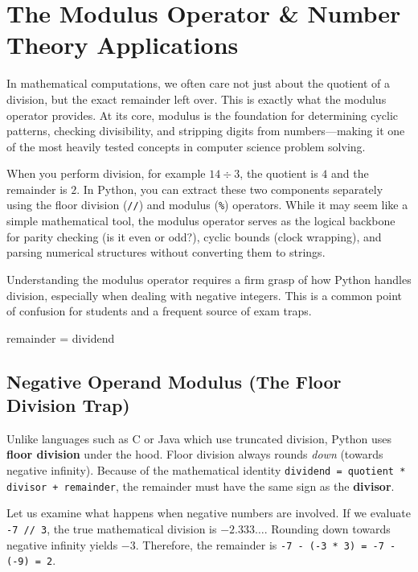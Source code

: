 \section{The Modulus Operator \& Number Theory Applications}

In mathematical computations, we often care not just about the quotient of a division, but the exact remainder left over. This is exactly what the modulus operator provides. At its core, modulus is the foundation for determining cyclic patterns, checking divisibility, and stripping digits from numbers---making it one of the most heavily tested concepts in computer science problem solving. 

When you perform division, for example $14 \div 3$, the quotient is $4$ and the remainder is $2$. In Python, you can extract these two components separately using the floor division (\texttt{//}) and modulus (\texttt{\%}) operators. While it may seem like a simple mathematical tool, the modulus operator serves as the logical backbone for parity checking (is it even or odd?), cyclic bounds (clock wrapping), and parsing numerical structures without converting them to strings.

Understanding the modulus operator requires a firm grasp of how Python handles division, especially when dealing with negative integers. This is a common point of confusion for students and a frequent source of exam traps.

\begin{syntaxbox}
remainder = dividend %
\end{syntaxbox}

\subsection{Negative Operand Modulus (The Floor Division Trap)}

Unlike languages such as C or Java which use truncated division, Python uses \textbf{floor division} under the hood. Floor division always rounds \textit{down} (towards negative infinity). Because of the mathematical identity \texttt{dividend = quotient * divisor + remainder}, the remainder must have the same sign as the \textbf{divisor}.

Let us examine what happens when negative numbers are involved. If we evaluate \texttt{-7 // 3}, the true mathematical division is $-2.333\dots$. Rounding down towards negative infinity yields $-3$. Therefore, the remainder is \texttt{-7 - (-3 * 3) = -7 - (-9) = 2}. 

